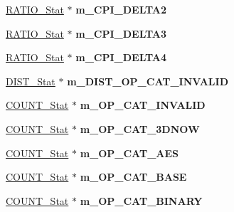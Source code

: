 \begin{DoxyCompactItemize}
\item 
\hypertarget{classall__stats__c_adaf596a4a267c04b05c9e780ad5add43}{
\hyperlink{classRATIO__Stat}{RATIO\_\-Stat} $\ast$ {\bfseries m\_\-CPI\_\-DELTA2}}
\label{classall__stats__c_adaf596a4a267c04b05c9e780ad5add43}

\item 
\hypertarget{classall__stats__c_aa1e9659e482cde2937d25b6bf66355d1}{
\hyperlink{classRATIO__Stat}{RATIO\_\-Stat} $\ast$ {\bfseries m\_\-CPI\_\-DELTA3}}
\label{classall__stats__c_aa1e9659e482cde2937d25b6bf66355d1}

\item 
\hypertarget{classall__stats__c_ad0967d0322c3b3d0e16b7754cb6ce35c}{
\hyperlink{classRATIO__Stat}{RATIO\_\-Stat} $\ast$ {\bfseries m\_\-CPI\_\-DELTA4}}
\label{classall__stats__c_ad0967d0322c3b3d0e16b7754cb6ce35c}

\item 
\hypertarget{classall__stats__c_a55ad8cd6d6f89cbb27148fa9043d1826}{
\hyperlink{classDIST__Stat}{DIST\_\-Stat} $\ast$ {\bfseries m\_\-DIST\_\-OP\_\-CAT\_\-INVALID}}
\label{classall__stats__c_a55ad8cd6d6f89cbb27148fa9043d1826}

\item 
\hypertarget{classall__stats__c_a43bd1a60969418fad1c4dce7e304d3a5}{
\hyperlink{classCOUNT__Stat}{COUNT\_\-Stat} $\ast$ {\bfseries m\_\-OP\_\-CAT\_\-INVALID}}
\label{classall__stats__c_a43bd1a60969418fad1c4dce7e304d3a5}

\item 
\hypertarget{classall__stats__c_a2a29b03d80a09a09d4bb0f5f1c609a86}{
\hyperlink{classCOUNT__Stat}{COUNT\_\-Stat} $\ast$ {\bfseries m\_\-OP\_\-CAT\_\-3DNOW}}
\label{classall__stats__c_a2a29b03d80a09a09d4bb0f5f1c609a86}

\item 
\hypertarget{classall__stats__c_a36369766c68934bb4ec8b93904fc61bd}{
\hyperlink{classCOUNT__Stat}{COUNT\_\-Stat} $\ast$ {\bfseries m\_\-OP\_\-CAT\_\-AES}}
\label{classall__stats__c_a36369766c68934bb4ec8b93904fc61bd}

\item 
\hypertarget{classall__stats__c_acc41405d99c06c9bc5a8fa217a70b8e7}{
\hyperlink{classCOUNT__Stat}{COUNT\_\-Stat} $\ast$ {\bfseries m\_\-OP\_\-CAT\_\-BASE}}
\label{classall__stats__c_acc41405d99c06c9bc5a8fa217a70b8e7}

\item 
\hypertarget{classall__stats__c_aef8bc9595b7c0a9b1297caa047edc349}{
\hyperlink{classCOUNT__Stat}{COUNT\_\-Stat} $\ast$ {\bfseries m\_\-OP\_\-CAT\_\-BINARY}}
\label{classall__stats__c_aef8bc9595b7c0a9b1297caa047edc349}


\end{DoxyCompactItemize}
